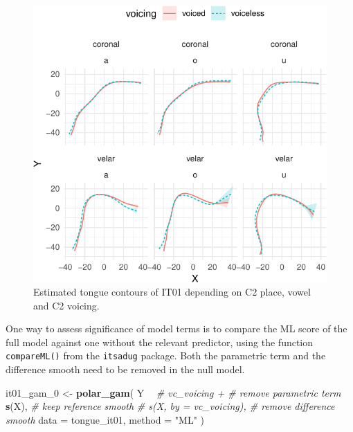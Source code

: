 \documentclass[12pt,]{article}
\newenvironment{Shaded}{\begin{snugshade}}{\end{snugshade}}
\newcommand{\CommentTok}[1]{\textcolor[rgb]{0.56,0.35,0.01}{\textit{#1}}}
\newcommand{\DataTypeTok}[1]{\textcolor[rgb]{0.13,0.29,0.53}{#1}}
\newcommand{\DecValTok}[1]{\textcolor[rgb]{0.00,0.00,0.81}{#1}}
\newcommand{\KeywordTok}[1]{\textcolor[rgb]{0.13,0.29,0.53}{\textbf{#1}}}
\newcommand{\NormalTok}[1]{#1}
\newcommand{\OperatorTok}[1]{\textcolor[rgb]{0.81,0.36,0.00}{\textbf{#1}}}
\newcommand{\StringTok}[1]{\textcolor[rgb]{0.31,0.60,0.02}{#1}}
\begin{document}
\begin{figure}

{\centering \includegraphics[width=\linewidth]{2018-polar-gam_files/figure-latex/it01-gam-plot-1} 

}

\caption{Estimated tongue contours of IT01 depending on C2 place, vowel and C2 voicing.}\label{f:it01-gam-plot}
\end{figure}

One way to assess significance of model terms is to compare the ML score
of the full model against one without the relevant predictor, using the
function \texttt{compareML()} from the \texttt{itsadug} package. Both
the parametric term and the difference smooth need to be removed in the
null model.

\begin{Shaded}
\begin{Highlighting}[]
\NormalTok{it01_gam_}\DecValTok{0}\NormalTok{ <-}\StringTok{ }\KeywordTok{polar_gam}\NormalTok{(}
\NormalTok{  Y }\OperatorTok{~}
\StringTok{    }\CommentTok{# vc_voicing +            # remove parametric term}
\StringTok{    }\KeywordTok{s}\NormalTok{(X),                     }\CommentTok{# keep reference smooth}
    \CommentTok{# s(X, by = vc_voicing),  # remove difference smooth}
  \DataTypeTok{data =}\NormalTok{ tongue_it01,}
  \DataTypeTok{method =} \StringTok{"ML"}
\NormalTok{)}
\end{Highlighting}
\end{Shaded}
\end{document}
